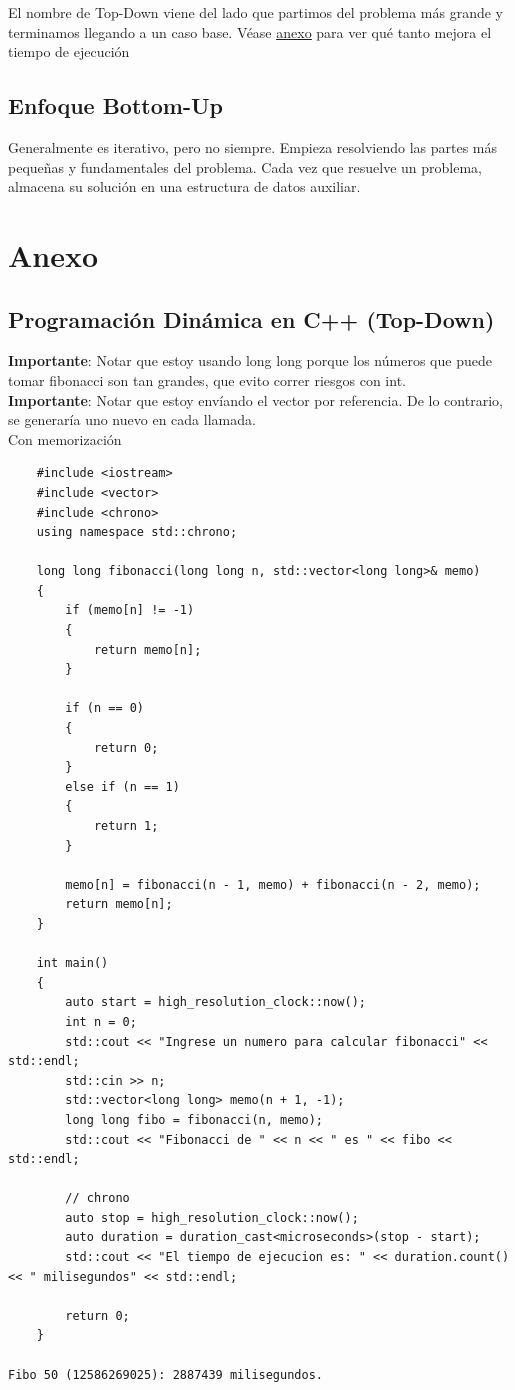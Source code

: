 \documentclass[10pt,a4paper]{article}
\begin{document}
El nombre de Top-Down viene del lado que partimos del problema más grande y terminamos llegando a un caso base.
Véase \hyperref[subsec:top_down_programacion_dinamica]{\underline{anexo}} para ver qué tanto mejora el tiempo de ejecución
\subsection*{Enfoque Bottom-Up}
Generalmente es iterativo, pero no siempre. Empieza resolviendo las partes más pequeñas y fundamentales del problema. Cada vez que resuelve un problema, almacena su solución en una estructura de datos auxiliar.
\section*{Anexo}
\subsection*{Programación Dinámica en C++ (Top-Down)}
\label{subsec:top_down_programacion_dinamica}
\textbf{Importante}: Notar que estoy usando long long porque los números que puede tomar fibonacci son tan grandes, que evito correr riesgos con int. \\
\textbf{Importante}: Notar que estoy envíando el vector por referencia. De lo contrario, se generaría uno nuevo en cada llamada. \\
Con memorización
\begin{lstlisting}
    #include <iostream>
    #include <vector>
    #include <chrono>
    using namespace std::chrono;

    long long fibonacci(long long n, std::vector<long long>& memo)
    {
        if (memo[n] != -1)
        {
            return memo[n];
        }

        if (n == 0)
        {
            return 0;
        }
        else if (n == 1)
        {
            return 1;
        }

        memo[n] = fibonacci(n - 1, memo) + fibonacci(n - 2, memo);
        return memo[n];
    }

    int main()
    {
        auto start = high_resolution_clock::now();
        int n = 0;
        std::cout << "Ingrese un numero para calcular fibonacci" << std::endl;
        std::cin >> n;
        std::vector<long long> memo(n + 1, -1);
        long long fibo = fibonacci(n, memo);
        std::cout << "Fibonacci de " << n << " es " << fibo << std::endl;

        // chrono
        auto stop = high_resolution_clock::now();
        auto duration = duration_cast<microseconds>(stop - start);
        std::cout << "El tiempo de ejecucion es: " << duration.count() << " milisegundos" << std::endl;

        return 0;
    }
    
Fibo 50 (12586269025): 2887439 milisegundos.
\end{lstlisting}
\end{document}
